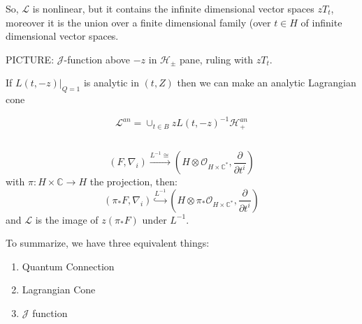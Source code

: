 \documentclass{amsart}
\theoremstyle{definition}
\newcommand{\OO}{\mathcal{O}}
\newcommand{\J}{\mathcal{J}}
\newcommand{\C}{\mathbb{C}}
\begin{document}
So, $\mathcal{L}$ is nonlinear, but it contains the infinite dimensional vector spaces $zT_t$, moreover it is the union over a finite dimensional family (over $t\in H$ of infinite dimensional vector spaces.  

PICTURE: $\J$-function above $-z$ in $\mathcal{H}_\pm$ pane, ruling with $zT_t$.

If $L(t,-z)|_{Q=1}$ is analytic in $(t,Z)$ then we can make an analytic Lagrangian cone

$$\mathcal{L}^{an}=\cup_{t\in B} zL(t,-z)^{-1}\mathcal{H}^{an}_+$$

\subsection{}
$$(F,\nabla_i)\stackrel{L^{-1}\cong}\to\left(H\otimes\OO_{H\times\C^*},\frac{\partial}{\partial t^i}\right)$$
with $\pi:H\times\C\to H$ the projection, then:
$$(\pi_*F,\nabla_i)\stackrel{L^{-1}}\hookrightarrow\left(H\otimes\pi_*\OO_{H\times\C^*},\frac{\partial}{\partial t^i}\right)$$
and $\mathcal{L}$ is the image of $z(\pi_* F)$ under $L^{-1}$.

To summarize, we have three equivalent things:
\begin{enumerate}
\item Quantum Connection
\item Lagrangian Cone
\item $\J$ function
\end{enumerate}
\end{document}
